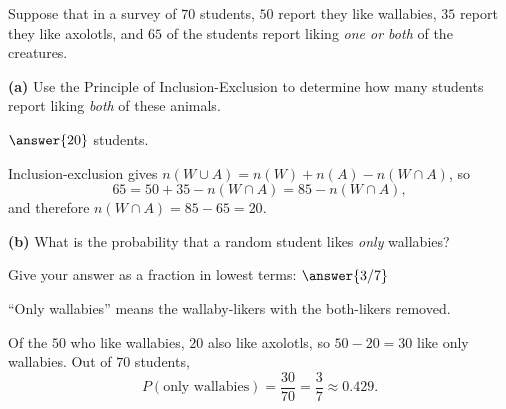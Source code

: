 \documentclass[12pt]{ximera}
\begin{document}
\begin{problem}
Suppose that in a survey of $70$ students, $50$ report they like wallabies, $35$
report they like axolotls, and $65$ of the students report liking \emph{one or both}
of the creatures.

\begin{prompt}
\textbf{(a)} Use the Principle of Inclusion-Exclusion to determine how many students
report liking \emph{both} of these animals.

$\answer{20}$ students.

\begin{feedback}
Inclusion-exclusion gives $n(W\cup A)=n(W)+n(A)-n(W\cap A)$, so
\[ 65 = 50+35-n(W\cap A) = 85 - n(W\cap A), \]
and therefore $n(W\cap A)=85-65=20$.
\end{feedback}
\end{prompt}

\begin{prompt}
\textbf{(b)} What is the probability that a random student likes \emph{only}
wallabies?

Give your answer as a fraction in lowest terms: $\answer{3/7}$

\begin{hint}
``Only wallabies'' means the wallaby-likers with the both-likers removed.
\end{hint}

\begin{feedback}
Of the $50$ who like wallabies, $20$ also like axolotls, so $50-20=30$ like only
wallabies. Out of $70$ students,
\[ P(\text{only wallabies})=\frac{30}{70}=\frac{3}{7}\approx 0.429. \]
\end{feedback}
\end{prompt}
\end{problem}
\end{document}
